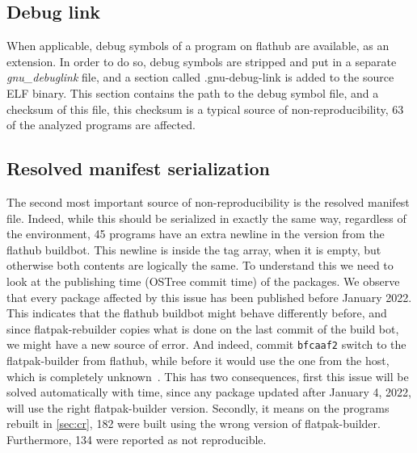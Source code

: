 \documentclass[a4paper,11pt,oneside]{report}
\theoremstyle{definition}
\newcommand{\sysname}{flatpak-rebuilder\xspace}
\newcommand{\fh}{flathub\xspace}
\newcommand{\fb}{flatpak-builder\xspace}
\newcommand{\fhbb}{flathub buildbot\xspace}
\newcommand{\ot}{OSTree\xspace}
\begin{document}
\subsection*{Debug link}
When applicable, debug symbols of a program on \fh are available, as an
extension. In order to do so, debug symbols are stripped and put in a separate
\emph{gnu\_debuglink} file, and a section called .gnu-debug-link is added to
the source ELF binary. This section contains the path to the debug symbol file,
and a checksum of this file, this checksum is a typical source of
non-reproducibility, 63 of the analyzed programs are affected.

\subsection*{Resolved manifest serialization}
The second most important source of non-reproducibility is the resolved
manifest file. Indeed, while this should be serialized in exactly the same way,
regardless of the environment, 45 programs have an extra newline in the version
from the \fhbb. This newline is inside the tag array, when it is empty, but
otherwise both contents are logically the same. To understand this we need to
look at the publishing time (\ot commit time) of the packages. We observe that
every package affected by this issue has been published before January 2022.
This indicates that the \fhbb might behave differently before, and since
\sysname copies what is done on the last commit of the build bot, we might have
a new source of error. And indeed, commit \verb|bfcaaf2| switch to the \fb from
\fh, while before it would use the one from the host, which is completely
unknown~\cite{gh:ptdr}. This has two consequences, first this issue will be
solved automatically with time, since any package updated after January 4,
2022, will use the right \fb version. Secondly, it means on the programs
rebuilt in \autoref{sec:cr}, 182 were built using the wrong version of \fb.
Furthermore, 134 were reported as not reproducible.
\end{document}
